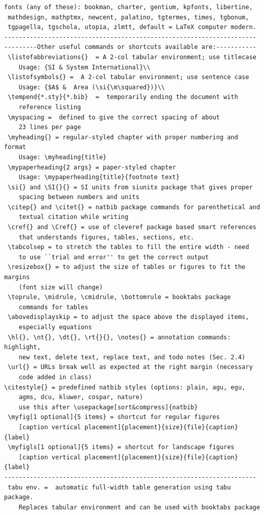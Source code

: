 \documentclass[phd,showgrids]{ndsu-thesis-2022}
\renewcommand\myspacing{1.9} %
\begin{document}
\begin{lstlisting}[basicstyle=\ttfamily\footnotesize\color{blue}]
 fonts (any of these): bookman, charter, gentium, kpfonts, libertine, 
 mathdesign, mathptmx, newcent, palatino, tgtermes, times, tgbonum, 
 tgpagella, tgschola, utopia, zlmtt, default = LaTeX computer modern. 
---------------------------------------------------------------------
---------Other useful commands or shortcuts available are:-----------
 \listofabbreviations{}  = A 2-col tabular environment; use titlecase 
 	Usage: {SI & System International}\\
 \listofsymbols{} =  A 2-col tabular environment; use sentence case
 	Usage: {$A$ &  Area (\si{\m\squared})}\\
 \tempend{*.sty}{*.bib}  =  temporarily ending the document with 
 	reference listing
 \myspacing =  defined to give the correct spacing of about 
 	23 lines per page
 \myheading{} = regular-styled chapter with proper numbering and format
 	Usage: \myheading{title}
 \mypaperheading{2 args} = paper-styled chapter 
 	Usage: \mypaperheading{title}{footnote text}
 \si{} and \SI{}{} = SI units from siunitx package that gives proper 
 	spacing between numbers and units
 \citep{} and \citet{} = natbib package commands for parenthetical and 
 	textual citation while writing 
 \cref{} and \Cref{} = use of cleveref package based smart references 
 	that understands figures, tables, sections, etc. 
 \tabcolsep = to stretch the tables to fill the entire width - need
 	to use ``trial and error'' to get the correct output
 \resizebox{} = to adjust the size of tables or figures to fit the margins 
 	(font size will change)
 \toprule, \midrule, \cmidrule, \bottomrule = booktabs package 
 	commands for tables
 \abovedisplayskip = to adjust the space above the displayed items, 
 	especially equations 
 \hl{}, \nt{}, \dt{}, \rt{}{}, \notes{} = annotation commands: highlight, 
 	new text, delete text, replace text, and todo notes (Sec. 2.4)
 \url{} = URLs break well as expected at the right margin (necessary 
 	code added in class)	
\citestyle{} = predefined natbib styles (options: plain, agu, egu, 
	agms, dcu, kluwer, cospar, nature) 
	use this after \usepackage[sort&compress]{natbib}
 \myfig[1 optional]{5 items} = shortcut for regular figures 
 	[caption vertical placement]{placement}{size}{file}{caption}{label}
 \myfigls[1 optional]{5 items} = shortcut for landscape figures 
 	[caption vertical placement]{placement}{size}{file}{caption}{label}	
---------------------------------------------------------------------
 tabu env. =  automatic full-width table generation using tabu package. 
 	Replaces tabular environment and can be used with booktabs package

\end{lstlisting}
\end{document}
